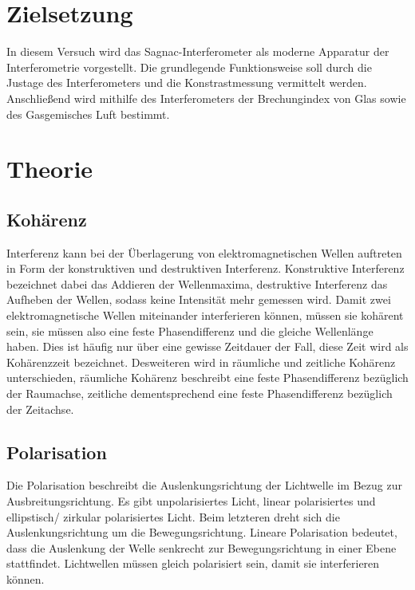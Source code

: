 \section{Zielsetzung}
\label{sec:Ziel} 
\noindent
In diesem Versuch wird das Sagnac-Interferometer als moderne Apparatur der Interferometrie vorgestellt. Die grundlegende Funktionsweise soll durch die Justage des Interferometers 
und die Konstrastmessung vermittelt werden. Anschließend wird mithilfe des Interferometers der Brechungindex von Glas sowie des Gasgemisches Luft bestimmt. 

\section{Theorie}
\label{sec:Theorie}


\subsection{Kohärenz}

\noindent Interferenz kann bei der Überlagerung von elektromagnetischen Wellen auftreten in Form der konstruktiven und destruktiven Interferenz. Konstruktive Interferenz bezeichnet dabei das
Addieren der Wellenmaxima, destruktive Interferenz das Aufheben der Wellen, sodass keine Intensität mehr gemessen wird. Damit zwei elektromagnetische Wellen miteinander interferieren können, 
müssen sie kohärent sein, sie müssen also eine feste Phasendifferenz und die gleiche Wellenlänge haben. Dies ist häufig nur über eine gewisse Zeitdauer der Fall, diese Zeit wird als 
Kohärenzzeit bezeichnet. Desweiteren wird in räumliche und zeitliche Kohärenz unterschieden, räumliche Kohärenz beschreibt eine feste Phasendifferenz bezüglich der Raumachse, zeitliche 
dementsprechend eine feste Phasendifferenz bezüglich der Zeitachse. 


\subsection{Polarisation}

\noindent Die Polarisation beschreibt die Auslenkungsrichtung der Lichtwelle im Bezug zur Ausbreitungsrichtung. Es gibt unpolarisiertes Licht, linear polarisiertes und ellipstisch/
zirkular polarisiertes Licht. Beim letzteren dreht sich die Auslenkungsrichtung um die Bewegungsrichtung. Lineare Polarisation bedeutet, dass die Auslenkung der Welle senkrecht zur 
Bewegungsrichtung in einer Ebene stattfindet. Lichtwellen müssen gleich polarisiert sein, damit sie interferieren können. 


